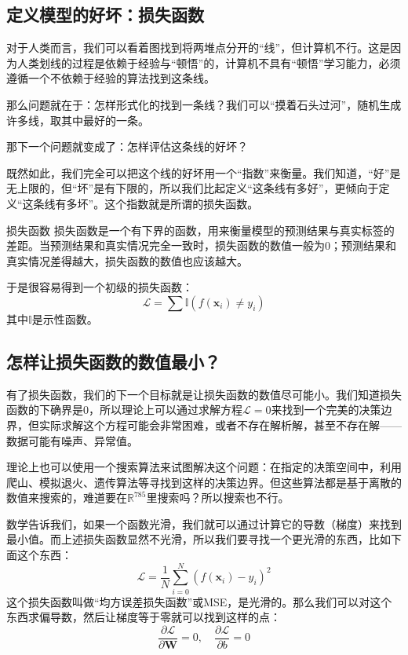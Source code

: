 \subsection{定义模型的好坏：损失函数}

对于人类而言，我们可以看着图找到将两堆点分开的“线”，但计算机不行。这是因为人类划线的过程是依赖于经验与“顿悟”的，计算机不具有“顿悟”学习能力，必须遵循一个不依赖于经验的算法找到这条线。

那么问题就在于：怎样形式化的找到一条线？我们可以“摸着石头过河”，随机生成许多线，取其中最好的一条。

那下一个问题就变成了：怎样评估这条线的好坏？

既然如此，我们完全可以把这个线的好坏用一个“指数”来衡量。我们知道，“好”是无上限的，但“坏”是有下限的，所以我们比起定义“这条线有多好”，更倾向于定义“这条线有多坏”。这个指数就是所谓的损失函数。

\begin{definition}{损失函数}{}
    损失函数是一个有下界的函数，用来衡量模型的预测结果与真实标签的差距。当预测结果和真实情况完全一致时，损失函数的数值一般为0；预测结果和真实情况差得越大，损失函数的数值也应该越大。
\end{definition}

于是很容易得到一个初级的损失函数：
\[ \mathcal{L} = \sum \mathbb{I}(f(\mathbf{x}_i)\neq y_i) \]
其中$\mathbb{I}$是示性函数。

\subsection{怎样让损失函数的数值最小？}

有了损失函数，我们的下一个目标就是让损失函数的数值尽可能小。我们知道损失函数的下确界是0，所以理论上可以通过求解方程$\mathcal{L}=0$来找到一个完美的决策边界，但实际求解这个方程可能会非常困难，或者不存在解析解，甚至不存在解——数据可能有噪声、异常值。

理论上也可以使用一个搜索算法来试图解决这个问题：在指定的决策空间中，利用爬山、模拟退火、遗传算法等寻找到这样的决策边界。但这些算法都是基于离散的数值来搜索的，难道要在$\mathbb{R}^{785}$里搜索吗？所以搜索也不行。

数学告诉我们，如果一个函数光滑，我们就可以通过计算它的导数（梯度）来找到最小值。而上述损失函数显然不光滑，所以我们要寻找一个更光滑的东西，比如下面这个东西：
\[ \mathcal{L} = \frac{1}{N} \sum_{i=0}^N (f(\mathbf{x}_i)- y_i)^2\]
这个损失函数叫做“均方误差损失函数”或MSE，是光滑的。那么我们可以对这个东西求偏导数，然后让梯度等于零就可以找到这样的点：
\[ \frac{\partial \mathcal{L}}{\partial \mathbf{W}} = 0, \quad
\frac{\partial \mathcal{L}}{\partial b} = 0 \]

